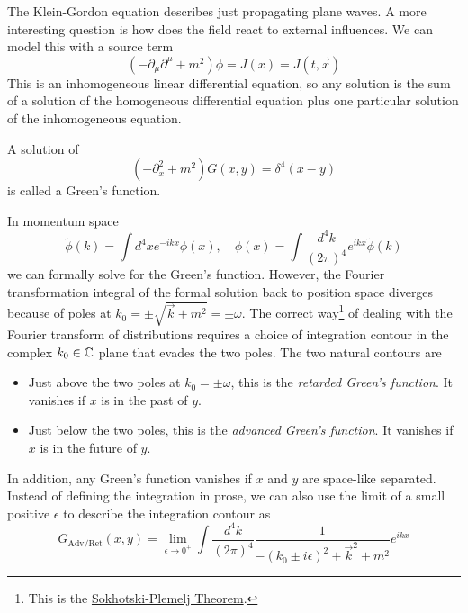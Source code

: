 \documentclass[12pt]{article}
\begin{document}
The Klein-Gordon equation describes just propagating plane waves. A
more interesting question is how does the field react to external
influences. We can model this with a source term
\begin{equation}
  (-\partial_\mu \partial^\mu + m^2) \phi = J(x) = J(t, \vec{x})
\end{equation}
This is an inhomogeneous linear differential equation, so any solution
is the sum of a solution of the homogeneous differential equation plus
one particular solution of the inhomogeneous equation.
\begin{definition} 
  A solution of 
  \begin{equation}
    (-\partial_x^2 + m^2) G(x,y) = \delta^4(x-y)
  \end{equation}
  is called a Green's function.
\end{definition}
In momentum space
\begin{equation}
  \tilde\phi(k) = \int d^4x e^{-ikx} \phi(x)
  ,\quad
  \phi(x) = \int \frac{d^4k}{(2\pi)^4} e^{ikx} \tilde\phi(k)
\end{equation}
we can formally solve for the Green's function. However, the Fourier
transformation integral of the formal solution back to position space
diverges because of poles at $k_0 = \pm \sqrt{\vec{k}+ m^2} = \pm
\omega$. The correct way\footnote{This is the
  \href{http://en.wikipedia.org/wiki/Sokhotski-Plemelj_theorem}{Sokhotski-Plemelj
    Theorem}.} of dealing with the Fourier transform of distributions
requires a choice of integration contour in the complex $k_0\in{\mathbb{C}}$
plane that evades the two poles. The two natural contours are
\begin{itemize}
\item Just above the two poles at $k_0=\pm \omega$, this is the
  \emph{retarded Green's function}. It vanishes if $x$ is in the past
  of $y$.
\item Just below the two poles, this is the \emph{advanced Green's
    function}. It vanishes if $x$ is in the future of $y$.
\end{itemize}
In addition, any Green's function vanishes if $x$ and $y$ are
space-like separated.  Instead of defining the integration in prose,
we can also use the limit of a small positive $\epsilon$ to describe
the integration contour as
\begin{equation}
  G_{\text{Adv}/\text{Ret}}(x, y) = 
  \lim_{\epsilon\to 0^+}
  \int \frac{d^4k}{(2\pi)^4} 
  \frac{1}{-(k_0 \pm i \epsilon)^2 + \vec{k}^2 + m^2}
  e^{ikx}
\end{equation}
\end{document}
